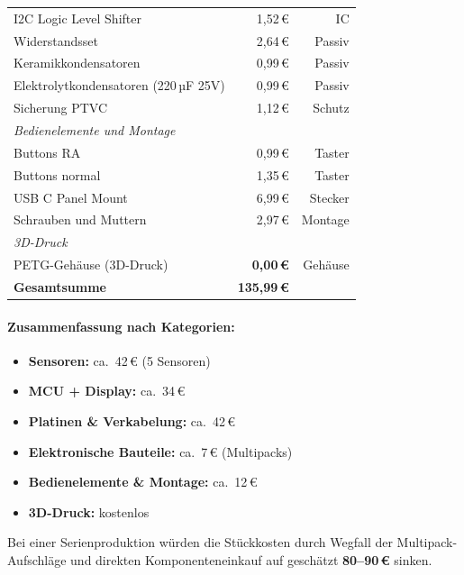 \begin{table}[htb]
\begin{tabular}{p{7cm} r r}
I2C Logic Level Shifter & 1,52\,\euro{} & IC \\
Widerstandsset & 2,64\,\euro{} & Passiv \\
Keramikkondensatoren & 0,99\,\euro{} & Passiv \\
Elektrolytkondensatoren (220\,µF 25V) & 0,99\,\euro{} & Passiv \\
Sicherung PTVC & 1,12\,\euro{} & Schutz \\
\midrule
\multicolumn{3}{l}{\textit{Bedienelemente und Montage}} \\
Buttons RA & 0,99\,\euro{} & Taster \\
Buttons normal & 1,35\,\euro{} & Taster \\
USB C Panel Mount & 6,99\,\euro{} & Stecker \\
Schrauben und Muttern & 2,97\,\euro{} & Montage \\
\midrule
\multicolumn{3}{l}{\textit{3D-Druck}} \\
PETG-Gehäuse (3D-Druck) & \textbf{0,00\,\euro{}} & Gehäuse \\
\midrule
\midrule
\textbf{Gesamtsumme} & \textbf{135,99\,\euro{}} & \\
\bottomrule
\end{tabular}
\end{table}

\paragraph{Zusammenfassung nach Kategorien:}
\begin{itemize}[nosep]
\item \textbf{Sensoren:} ca.\ 42\,\euro{} (5 Sensoren)
\item \textbf{MCU + Display:} ca.\ 34\,\euro{}
\item \textbf{Platinen \& Verkabelung:} ca.\ 42\,\euro{}
\item \textbf{Elektronische Bauteile:} ca.\ 7\,\euro{} (Multipacks)
\item \textbf{Bedienelemente \& Montage:} ca.\ 12\,\euro{}
\item \textbf{3D-Druck:} kostenlos
\end{itemize}

Bei einer Serienproduktion würden die Stückkosten durch Wegfall der Multipack-Aufschläge und direkten Komponenteneinkauf auf geschätzt \textbf{80--90\,\euro{}} sinken.

\setcounter{chapter}{3}
\setcounter{section}{0}
\setcounter{table}{0}
\setcounter{figure}{0}

